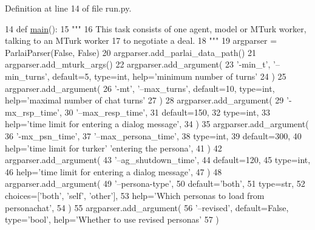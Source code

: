 Definition at line 14 of file run.\+py.


\begin{DoxyCode}
14 \textcolor{keyword}{def }\hyperlink{namespaceprojects_1_1wizard__of__wikipedia_1_1mturk__evaluation__task_1_1run_ad3ab2c71f8083c3112815c0b363d316b}{main}():
15     \textcolor{stringliteral}{"""}
16 \textcolor{stringliteral}{    This task consists of one agent, model or MTurk worker, talking to an MTurk worker}
17 \textcolor{stringliteral}{    to negotiate a deal.}
18 \textcolor{stringliteral}{    """}
19     argparser = ParlaiParser(\textcolor{keyword}{False}, \textcolor{keyword}{False})
20     argparser.add\_parlai\_data\_path()
21     argparser.add\_mturk\_args()
22     argparser.add\_argument(
23         \textcolor{stringliteral}{'-min\_t'}, \textcolor{stringliteral}{'--min\_turns'}, default=5, type=int, help=\textcolor{stringliteral}{'minimum number of turns'}
24     )
25     argparser.add\_argument(
26         \textcolor{stringliteral}{'-mt'}, \textcolor{stringliteral}{'--max\_turns'}, default=10, type=int, help=\textcolor{stringliteral}{'maximal number of chat turns'}
27     )
28     argparser.add\_argument(
29         \textcolor{stringliteral}{'-mx\_rsp\_time'},
30         \textcolor{stringliteral}{'--max\_resp\_time'},
31         default=150,
32         type=int,
33         help=\textcolor{stringliteral}{'time limit for entering a dialog message'},
34     )
35     argparser.add\_argument(
36         \textcolor{stringliteral}{'-mx\_psn\_time'},
37         \textcolor{stringliteral}{'--max\_persona\_time'},
38         type=int,
39         default=300,
40         help=\textcolor{stringliteral}{'time limit for turker'} \textcolor{stringliteral}{'entering the persona'},
41     )
42     argparser.add\_argument(
43         \textcolor{stringliteral}{'--ag\_shutdown\_time'},
44         default=120,
45         type=int,
46         help=\textcolor{stringliteral}{'time limit for entering a dialog message'},
47     )
48     argparser.add\_argument(
49         \textcolor{stringliteral}{'--persona-type'},
50         default=\textcolor{stringliteral}{'both'},
51         type=str,
52         choices=[\textcolor{stringliteral}{'both'}, \textcolor{stringliteral}{'self'}, \textcolor{stringliteral}{'other'}],
53         help=\textcolor{stringliteral}{'Which personas to load from personachat'},
54     )
55     argparser.add\_argument(
56         \textcolor{stringliteral}{'--revised'}, default=\textcolor{keyword}{False}, type=\textcolor{stringliteral}{'bool'}, help=\textcolor{stringliteral}{'Whether to use revised personas'}
57     )

\end{DoxyCode}

